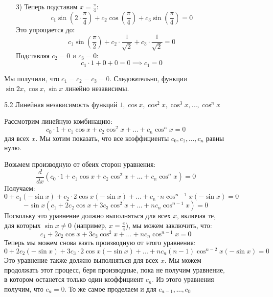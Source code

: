 \documentclass[a4paper]{article}
\begin{document}
\begin{enumerate}
\begin{enumerate}
\begin{enumerate}
            \item[3)]
            Теперь подставим $ x = \frac{\pi}{4} $:
            $$
            c_1 \sin\left(2 \cdot \frac{\pi}{4}\right) + c_2 \cos\left(\frac{\pi}{4}\right) + c_3 \sin\left(\frac{\pi}{4}\right) = 0
            $$
            Это упрощается до:
            $$
            c_1 \sin\left(\frac{\pi}{2}\right) + c_2 \cdot \frac{1}{\sqrt{2}} + c_3 \cdot \frac{1}{\sqrt{2}} = 0
            $$
            Подставляя $ c_2 = 0 $ и $ c_3 = 0 $:
            $$
            c_1 \cdot 1 + 0 + 0 = 0 \implies c_1 = 0
            $$
        \end{enumerate}
        
        Мы получили, что $ c_1 = c_2 = c_3 = 0 $. Следовательно, функции $ \sin 2x, \cos x, \sin x $ линейно независимы.\\

        \item[5.2]Линейная независимость функций $ 1, \cos x, \cos^2 x, \cos^3 x, \ldots, \cos^n x $

        Рассмотрим линейную комбинацию:
        $$
        c_0 \cdot 1 + c_1 \cos x + c_2 \cos^2 x + \ldots + c_n \cos^n x = 0
        $$
        для всех $ x $. Мы хотим показать, что все коэффициенты $ c_0, c_1, \ldots, c_n $ равны нулю.

        Возьмем производную от обеих сторон уравнения:
        $$
        \frac{d}{dx} \left( c_0 \cdot 1 + c_1 \cos x + c_2 \cos^2 x + \ldots + c_n \cos^n x \right) = 0
        $$
        Получаем:
        $$
        0 + c_1 (-\sin x) + c_2 \cdot 2 \cos x (-\sin x) + \ldots + c_n \cdot n \cos^{n-1} x (-\sin x) = 0
        $$
        $$
        -\sin x \left( c_1 + 2c_2 \cos x + 3c_3 \cos^2 x + \ldots + n c_n \cos^{n-1} x \right) = 0
        $$
        Поскольку это уравнение должно выполняться для всех $ x $, включая те, для которых $ \sin x \neq 0 $ (например, $ x = \frac{\pi}{4} $), мы можем заключить, что:
        $$
        c_1 + 2c_2 \cos x + 3c_3 \cos^2 x + \ldots + n c_n \cos^{n-1} x = 0
        $$
        Теперь мы можем снова взять производную от этого уравнения:
        $$
        0 + 2c_2 (-\sin x) + 3c_3 \cdot 2 \cos x (-\sin x) + \ldots + n c_n (n-1) \cos^{n-2} x (-\sin x) = 0
        $$
        Это уравнение также должно выполняться для всех $ x $. Мы можем продолжать этот процесс, беря производные, пока не получим уравнение, в котором останется только один коэффициент $ c_n $.
        Из этого уравнения получим, что $c_n = 0$. То же самое проделаем и для $c_{n-1}, \dots, c_{0}$ 


\end{enumerate}
\end{enumerate}
\end{document}
